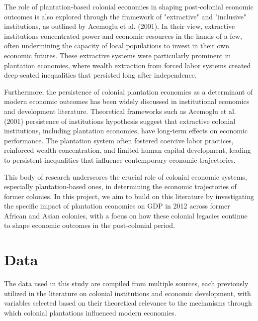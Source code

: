\documentclass[12pt]{article}
\begin{document}
\vspace{0.2in}
\noindent The role of plantation-based colonial economies in shaping post-colonial economic outcomes is also explored through the framework of "extractive" and "inclusive" institutions, as outlined by Acemoglu et al. (2001). In their view, extractive institutions concentrated power and economic resources in the hands of a few, often undermining the capacity of local populations to invest in their own economic futures. These extractive systems were particularly prominent in plantation economies, where wealth extraction from forced labor systems created deep-seated inequalities that persisted long after independence.

\noindent Furthermore, the persistence of colonial plantation economies as a determinant of modern economic outcomes has been widely discussed in institutional economics and development literature. Theoretical frameworks such as Acemoglu et al. (2001) persistence of institutions hypothesis suggest that extractive colonial institutions, including plantation economies, have long-term effects on economic performance. The plantation system often fostered coercive labor practices, reinforced wealth concentration, and limited human capital development, leading to persistent inequalities that influence contemporary economic trajectories.

\vspace{0.2in}
\noindent This body of research underscores the crucial role of colonial economic systems, especially plantation-based ones, in determining the economic trajectories of former colonies. In this project, we aim to build on this literature by investigating the specific impact of plantation economies on GDP in 2012 across former African and Asian colonies, with a focus on how these colonial legacies continue to shape economic outcomes in the post-colonial period.

\vspace{0.8 in}

\section{Data}

\vspace{0.2 in}
The data used in this study are compiled from multiple sources, each previously utilized in the literature on colonial institutions and economic development, with variables selected based on their theoretical relevance to the mechanisms through which colonial plantations influenced modern economies.
\end{document}
